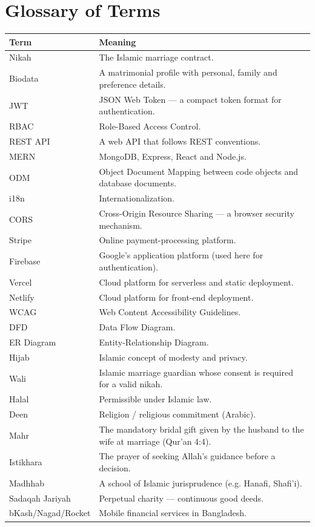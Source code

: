 \documentclass[12pt,a4paper]{report}
\begin{document}
\section{Glossary of Terms}
\begin{table}[H]
\centering
\small
\begin{tabularx}{\textwidth}{l X}
\toprule
\textbf{Term} & \textbf{Meaning} \\
\midrule
Nikah         & The Islamic marriage contract. \\
Biodata       & A matrimonial profile with personal, family and preference details. \\
JWT           & JSON Web Token --- a compact token format for authentication. \\
RBAC          & Role-Based Access Control. \\
REST API      & A web API that follows REST conventions. \\
MERN          & MongoDB, Express, React and Node.js. \\
ODM           & Object Document Mapping between code objects and database documents. \\
i18n          & Internationalization. \\
CORS          & Cross-Origin Resource Sharing --- a browser security mechanism. \\
Stripe        & Online payment-processing platform. \\
Firebase      & Google's application platform (used here for authentication). \\
Vercel        & Cloud platform for serverless and static deployment. \\
Netlify       & Cloud platform for front-end deployment. \\
WCAG          & Web Content Accessibility Guidelines. \\
DFD           & Data Flow Diagram. \\
ER Diagram    & Entity-Relationship Diagram. \\
Hijab         & Islamic concept of modesty and privacy. \\
Wali          & Islamic marriage guardian whose consent is required for a valid nikah. \\
Halal         & Permissible under Islamic law. \\
Deen          & Religion / religious commitment (Arabic). \\
Mahr          & The mandatory bridal gift given by the husband to the wife at marriage (Qur'an 4:4). \\
Istikhara     & The prayer of seeking Allah's guidance before a decision. \\
Madhhab       & A school of Islamic jurisprudence (e.g. Hanafi, Shafi'i). \\
Sadaqah Jariyah & Perpetual charity --- continuous good deeds. \\
bKash/Nagad/Rocket & Mobile financial services in Bangladesh. \\
\bottomrule
\end{tabularx}
\end{table}
\end{document}
